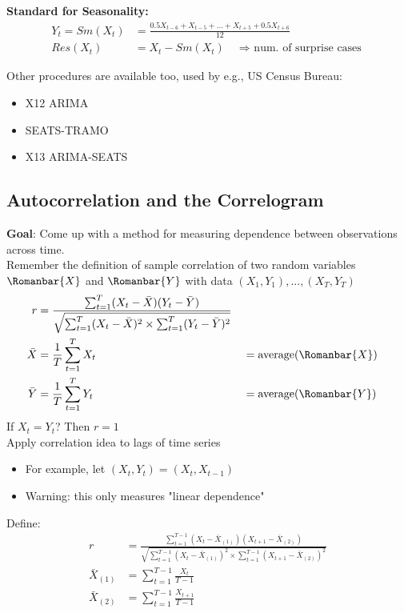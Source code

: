\textbf{Standard for Seasonality:}
\begin{align*}
    Y_t=Sm(X_t)&=\frac{0.5 X_{t-6} + X_{t-5}+...+X_{t+5} + 0.5 X_{t+6}}{12}\\
    Res(X_t)&=X_t-Sm(X_t) \quad \text{$\Rightarrow$ num. of surprise cases}
\end{align*}

Other procedures are available too, used by e.g., US Census Bureau:
\begin{itemize}
    \item X12 ARIMA
    \item SEATS-TRAMO
    \item X13 ARIMA-SEATS
\end{itemize}

\subsection{Autocorrelation and the Correlogram}

\textbf{Goal}: Come up with a method for measuring dependence between observations across time.\\

Remember the definition of sample correlation of two random variables $\Romanbar{X}$ and $\Romanbar{Y}$ with data $(X_1,Y_1), ..., (X_T,Y_T)$
\begin{align*}
    r&=\frac{\sum_{t=1}^T (X_t-\bar{X})(Y_t-\bar{Y})}{\sqrt{\sum_{t=1}^T (X_t-\bar{X})^2 \times \sum_{t=1}^T (Y_t-\bar{Y})^2}} \\
    \bar{X}&= \frac{1}{T} \sum_{t=1}^T X_t &&= \text{average}(\Romanbar{X}) \\
    \bar{Y} &= \frac{1}{T} \sum_{t=1}^T Y_t &&= \text{average}(\Romanbar{Y})
\end{align*}
If $X_t=Y_t$? Then $r=1$\\




Apply correlation idea to lags of time series
\begin{itemize}
    \item For example, let $(X_t, Y_t)=(X_t, X_{t-1})$
    \item Warning: this only measures "linear dependence"
\end{itemize}


Define:
\begin{align*}
        r&=\frac{\sum_{t=1}^{T-1} (X_t-\bar{X}_{(1)})(X_{t+1}-\bar{X}_{(2)})}{\sqrt{\sum_{t=1}^{T-1} (X_t-\bar{X}_{(1)})^2 \times \sum_{t=1}^{T-1} (X_{t+1}-\bar{X}_{(2)})^2}} \\
        \bar{X}_{(1)} &= \sum_{t=1}^{T-1} \frac{X_t}{T-1} \\
        \bar{X}_{(2)} &= \sum_{t=1}^{T-1} \frac{X_{t+1}}{T-1} 
\end{align*}

